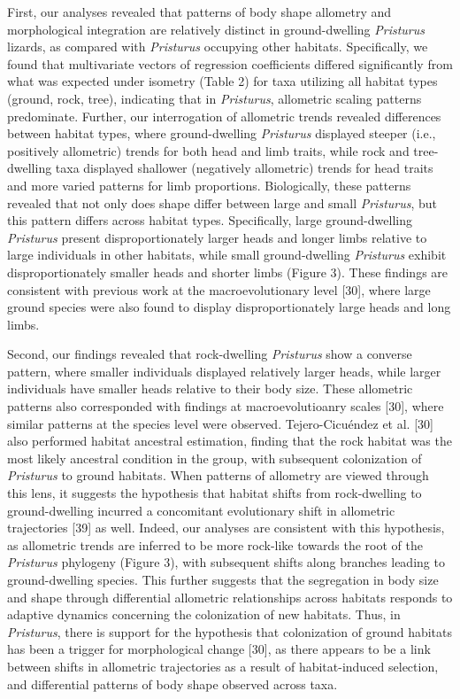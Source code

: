 \documentclass[
  11pt,
]{article}
\begin{document}
First, our analyses revealed that patterns of body shape allometry and
morphological integration are relatively distinct in ground-dwelling
\emph{Pristurus} lizards, as compared with \emph{Pristurus} occupying
other habitats. Specifically, we found that multivariate vectors of
regression coefficients differed significantly from what was expected
under isometry (Table 2) for taxa utilizing all habitat types (ground,
rock, tree), indicating that in \emph{Pristurus}, allometric scaling
patterns predominate. Further, our interrogation of allometric trends
revealed differences between habitat types, where ground-dwelling
\emph{Pristurus} displayed steeper (i.e., positively allometric) trends
for both head and limb traits, while rock and tree-dwelling taxa
displayed shallower (negatively allometric) trends for head traits and
more varied patterns for limb proportions. Biologically, these patterns
revealed that not only does shape differ between large and small
\emph{Pristurus}, but this pattern differs across habitat types.
Specifically, large ground-dwelling \emph{Pristurus} present
disproportionately larger heads and longer limbs relative to large
individuals in other habitats, while small ground-dwelling
\emph{Pristurus} exhibit disproportionately smaller heads and shorter
limbs (Figure 3). These findings are consistent with previous work at
the macroevolutionary level {[}30{]}, where large ground species were
also found to display disproportionately large heads and long limbs.
\hfill\break

Second, our findings revealed that rock-dwelling \emph{Pristurus} show a
converse pattern, where smaller individuals displayed relatively larger
heads, while larger individuals have smaller heads relative to their
body size. These allometric patterns also corresponded with findings at
macroevolutioanry scales {[}30{]}, where similar patterns at the species
level were observed. Tejero-Cicuéndez et al. {[}30{]} also performed
habitat ancestral estimation, finding that the rock habitat was the most
likely ancestral condition in the group, with subsequent colonization of
\emph{Pristurus} to ground habitats. When patterns of allometry are
viewed through this lens, it suggests the hypothesis that habitat shifts
from rock-dwelling to ground-dwelling incurred a concomitant
evolutionary shift in allometric trajectories {[}39{]} as well. Indeed,
our analyses are consistent with this hypothesis, as allometric trends
are inferred to be more rock-like towards the root of the
\emph{Pristurus} phylogeny (Figure 3), with subsequent shifts along
branches leading to ground-dwelling species. This further suggests that
the segregation in body size and shape through differential allometric
relationships across habitats responds to adaptive dynamics concerning
the colonization of new habitats. Thus, in \emph{Pristurus}, there is
support for the hypothesis that colonization of ground habitats has been
a trigger for morphological change {[}30{]}, as there appears to be a
link between shifts in allometric trajectories as a result of
habitat-induced selection, and differential patterns of body shape
observed across taxa. \hfill\break
\end{document}

